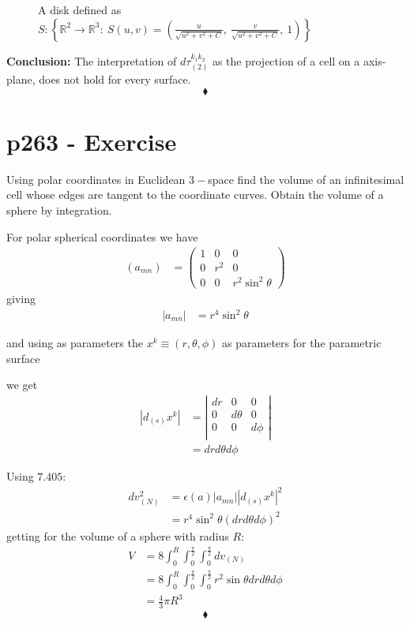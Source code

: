\begin{figure}[H]%
    \centering
    
\caption{A disk defined as $S: \left\{\mathbb{R}^2\rightarrow \mathbb{R}^3: \ S(u,v)= \left(\frac{u}{\sqrt{u^2+v^2+C}},\ \frac{v}{\sqrt{u^2+v^2+C}}, \ 1\right)\right\}$}
\label{fig:fig_p257}
\end{figure}
\textbf{Conclusion:} The interpretation of  $d\tau_{(2)}^{k_1k_2}$ as the projection of a cell on a axis-plane, does not hold for every surface.
$$\blacklozenge$$
\newpage




\section{p263 - Exercise}
\begin{tcolorbox}
Using polar coordinates in Euclidean $3-$space find the volume of an infinitesimal cell whose edges are tangent to the coordinate curves. Obtain the volume of a sphere by integration.
\end{tcolorbox}
For polar spherical coordinates we have
\begin{align}
\left(a_{mn}\right)&= \left(\begin{array}{lll}
1&0&0\\
0&r^2&0\\
0&0&r^2\sin^2\theta
\end{array}\right)
\end{align}
giving
\begin{align}
\left|a_{mn}\right| &= r^4\sin^2\theta
\end{align}

and using as parameters the $x^k \equiv(r,\theta,\phi)$ as parameters for the parametric surface

we get 
\begin{align}
\left|d_{(s)}x^k\right| &= \left|\begin{array}{lll}
dr&0&0\\
0&d\theta&0\\
0&0&d\phi\\
\end{array}\right|\\
&= drd\theta d\phi
\end{align}

Using $\mathbf{7.405}$:
\begin{align}
dv_{(N)}^2&= \epsilon (a)\left|a_{mn}\right|\left|d_{(s)}x^k\right|^2\\
&= r^4\sin^2\theta\left( drd\theta d\phi\right)^2
\end{align}
getting for the volume of a sphere with radius $R$:
\begin{align}
V&=8 \int_{0}^{R}\int_{0}^{\frac{\pi}{2}}\int_{0}^{\frac{\pi}{2}}dv_{(N)}\\
&= 8 \int_{0}^{R}\int_{0}^{\frac{\pi}{2}}\int_{0}^{\frac{\pi}{2}}r^2\sin\theta dr d\theta d\phi\\
&= \frac{4}{3}\pi R^3
\end{align}
$$\blacklozenge$$
\newpage




